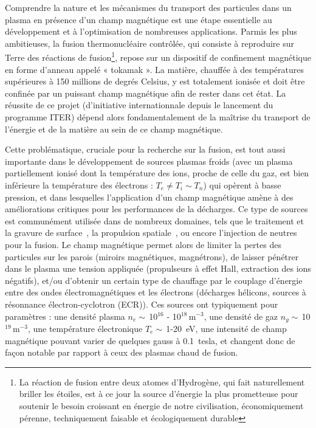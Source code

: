 
\begin{refsection}


Comprendre la nature et les mécanismes du transport des particules dans un
plasma en présence d'un champ magnétique est une étape essentielle au
développement et à l'optimisation de nombreuses applications.
Parmis les plus ambitieuses, la fusion thermonucléaire contrôlée, qui
consiste à reproduire sur Terre des réactions de fusion\footnote{La réaction de fusion entre deux atomes d'Hydrogène, 
qui fait naturellement briller les étoiles, est à ce jour la source d'énergie
la plus prometteuse pour soutenir le besoin croissant en énergie de notre civilisation,
économiquement pérenne, techniquement faisable et écologiquement durable}, repose sur un
dispositif de confinement magnétique en forme d'anneau appelé « tokamak ».
La matière, chauffée à des températures supérieures à 150 millions de degrés
Celsius, y est totalement ionisée et doit être confinée par un puissant champ magnétique afin
de rester dans cet état. La réussite de ce projet (d'initiative
internationnale depuis le lancement du programme ITER) dépend alors
fondamentalement de la maîtrise du transport de l'énergie et de la matière au
sein de ce champ magnétique.

Cette problématique, cruciale pour la recherche sur la fusion, est tout aussi
importante dans le développement de sources plasmas froids (avec un plasma
partiellement ionisé dont la température des ions, proche de celle du gaz,
est bien inférieure la température des électrons : $T_e\neq T_i\sim
T_n$) qui opèrent à basse pression, et dans lesquelles l'application d'un champ
magnétique amène à des améliorations critiques pour les performances de la
décharges. Ce type de sources est communément utilisée dans de
nombreux domaines, tels que le traitement et la gravure de
surface~\parencite{Lieberman}, la propulsion spatiale~\parencite{Zhurin}, ou
encore l'injection de neutres pour la fusion. Le champ magnétique permet alors
de limiter la pertes des particules sur les parois (miroirs magnétiques,
magnétrons), de laisser pénétrer dans le plasma une tension appliquée
(propulseurs à effet Hall, extraction des ions négatifs), et/ou d'obtenir un
certain type de chauffage par le couplage d'énergie entre des ondes
électromagnétiques et les électrons (décharges hélicons, sources à résonnance
électron-cyclotron (ECR)). Ces sources ont typiquement pour paramètres : une
densité plasma $n_e\sim\,$10$^{16}$ - 10$^{18}\,$m$^{-3}$, une densité de gaz
$n_g\sim\,$10$^{19}\,$m$^{-3}$, une température électronique $T_e\sim\,$1-20~eV,
une intensité de champ magnétique pouvant varier de quelques gauss à 0.1~tesla,
et changent donc de façon notable par rapport à ceux des plasmas chaud de fusion.


\end{refsection}
